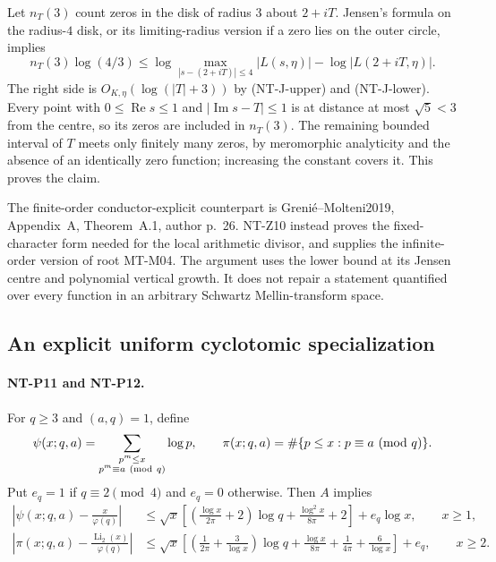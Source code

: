 \documentclass[11pt,a4paper]{article}
\begin{document}
Let $n_T(3)$ count zeros in the disk of radius $3$ about $2+iT$.
Jensen's formula on the radius-$4$ disk, or its limiting-radius version
if a zero lies on the outer circle, implies
\[
 n_T(3)\log(4/3)
 \le\log\max_{|s-(2+iT)|\le4}|L(s,\eta)|
                -\log|L(2+iT,\eta)|.
\]
The right side is $O_{K,\eta}(\log(|T|+3))$ by (NT-J-upper) and
(NT-J-lower).  Every point with $0\le\operatorname{Re}s\le1$ and
$|\operatorname{Im}s-T|\le1$ is at distance at most $\sqrt5<3$
from the centre, so its zeros are included in $n_T(3)$.  The remaining
bounded interval of $T$ meets only finitely many zeros, by meromorphic
analyticity and the absence of an identically zero function; increasing
the constant covers it.  This proves the claim.

The finite-order conductor-explicit counterpart is
Greni\'e--Molteni2019, Appendix~A, Theorem~A.1, author p.~26.
NT-Z10 instead proves the fixed-character form needed for the local
arithmetic divisor, and supplies the infinite-order version of root
MT-M04.  The argument uses the lower bound at its Jensen centre and
polynomial vertical growth.  It does not repair a statement quantified
over every function in an arbitrary Schwartz Mellin-transform space.

\subsection{An explicit uniform cyclotomic specialization}

\paragraph{NT-P11 and NT-P12.}
For $q\ge3$ and $(a,q)=1$, define
\[
 \psi(x;q,a)=\sum_{\substack{p^m\le x\\p^m\equiv a\ ({\rm mod}\ q)}}\log p,
 \qquad
 \pi(x;q,a)=\#\{p\le x:p\equiv a\ ({\rm mod}\ q)\}.
\]
Put $e_q=1$ if $q\equiv2\pmod4$ and $e_q=0$ otherwise.
Then $A$ implies
\begin{align*}
 \left|\psi(x;q,a)-\frac{x}{\varphi(q)}\right|
 &\le\sqrt{x}\left[
 \left(\frac{\log x}{2\pi}+2\right)\log q+
 \frac{\log^2x}{8\pi}+2\right]+e_q\log x,\qquad x\ge1,\\
 \left|\pi(x;q,a)-\frac{\operatorname{Li}_2(x)}{\varphi(q)}\right|
 &\le\sqrt{x}\left[
 \left(\frac1{2\pi}+\frac3{\log x}\right)\log q+
 \frac{\log x}{8\pi}+\frac1{4\pi}+\frac6{\log x}\right]+e_q,
 \qquad x\ge2.
\end{align*}
\end{document}
